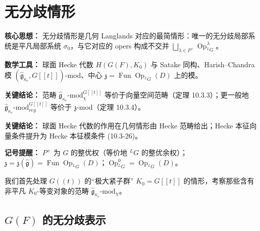
\section{无分歧情形}

\begin{keypoints}
    \item \textbf{核心思想：} 无分歧情形是几何 Langlands 对应的最简情形：唯一的无分歧局部系统是平凡局部系统 $\sigma_0$，与它对应的 opers 构成不交并 $\bigsqcup_{\lambda\in P^+}\operatorname{Op}^\lambda_{{}^LG}$。
    \item \textbf{数学工具：} 球面 Hecke 代数 $H(G(F),K_0)$ 与 Satake 同构、Harish--Chandra 模 $(\hat{\mathfrak{g}}_{\kappa_c},G[[t]])$-mod、中心 $\mathfrak{z}=\operatorname{Fun}\operatorname{Op}_{{}^LG}(D)$ 上的模。
    \item \textbf{关键结论：} 范畴 $\hat{\mathfrak{g}}_{\kappa_c}\text{-mod}^{G[[t]]}_\chi$ 等价于向量空间范畴（定理 10.3.3）；更一般地 $\hat{\mathfrak{g}}_{\kappa_c}\text{-mod}^{G[[t]]}_{reg}$ 等价于 $\mathfrak{z}$-mod（定理 10.3.4）。
    \item \textbf{关键结论：} 球面 Hecke 代数的作用在几何情形由 Hecke 范畴给出；Hecke 本征向量条件提升为 Hecke 本征模条件 (10.3-26)。
    \item \textbf{记号提醒：} $P^+$ 为 $G$ 的整优权（等价地 ${}^LG$ 的整优余权）；$\mathfrak{z}=\mathfrak{z}(\hat{\mathfrak{g}})=\operatorname{Fun}\operatorname{Op}_{{}^LG}(D)$；$\operatorname{Op}^0_{{}^LG}=\operatorname{Op}_{{}^LG}(D)$。
\end{keypoints}

我们首先处理 $G((t))$ 的“极大紧子群” $K_0=G[[t]]$ 的情形，考察那些含有非平凡 $K_0$-等变对象的范畴 $\hat{\mathfrak{g}}_{\kappa_c}\text{-mod}_\chi$。

\subsection{$G(F)$ 的无分歧表示}

